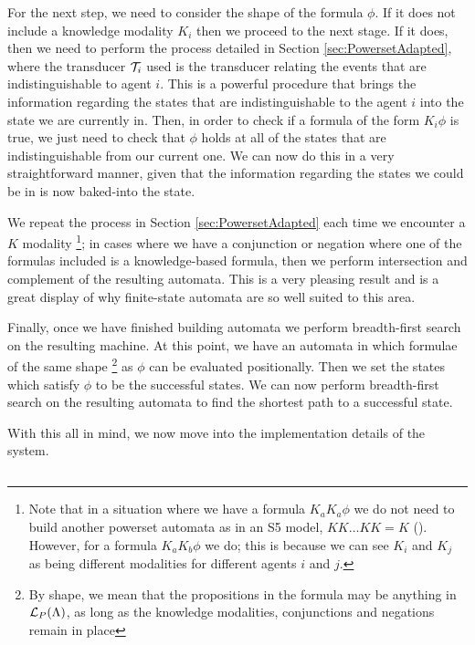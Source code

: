 \documentclass[12pt, a4paper]{article}
\begin{document}
For the next step, we need to consider the shape of the formula $\phi$. If it
does not include a knowledge modality $K_i$ then we proceed to the next stage.
If it does, then we need to perform the process detailed in Section
\ref{sec:PowersetAdapted}, where the transducer $\mathcal{T}_i$ used is the
transducer relating the events that are indistinguishable to agent $i$. This is
a powerful procedure that brings the information regarding the states that are
indistinguishable to the agent $i$ into the state we are currently in. Then, in
order to check if a formula of the form $K_i \phi$ is true, we just need to
check that $\phi$ holds at all of the states that are indistinguishable from our
current one. We can now do this in a very straightforward manner, given that the
information regarding the states we could be in is now baked-into the state.

We repeat the process in Section \ref{sec:PowersetAdapted} each time we
encounter a $K$ modality \footnote{Note that in a situation where we have a
  formula $K_a K_a \phi$ we do not need to build another powerset automata as in
  an \textsf{S5} model, $KK \ldots KK = K$ (\cite{ModalLogic}). However, for a
  formula $K_a K_b \phi$ we do; this is because we can see $K_i$ and $K_j$ as
  being different modalities for different agents $i$ and $j$.}; in cases where
we have a conjunction or negation where one of the formulas
included is a knowledge-based formula, then we perform intersection and
complement of the resulting automata. This is a very pleasing result and is a
great display of why finite-state automata are so well suited to this area.

Finally, once we have finished building automata we perform breadth-first search
on the resulting machine. At this point, we have an automata in which formulae
of the same shape \footnote{By shape, we mean that the propositions in the
  formula may be anything in $\mathcal{L}_P(\Lambda)$, as long as the knowledge
  modalities, conjunctions and negations remain in place} as $\phi$ can be
evaluated positionally. Then we set the states which satisfy $\phi$ to
be the successful states. We can now perform breadth-first search on the
resulting automata to find the shortest path to a successful state.

\bigskip \bigskip \bigskip

With this all in mind, we now move into the implementation details of the
system. 

\subsection{\mestar}
\label{subsec:mestar}
\end{document}
